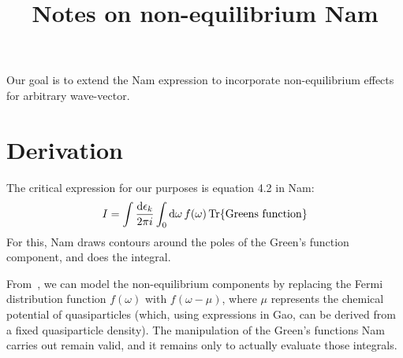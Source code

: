 \documentclass{article}
\title{Notes on non-equilibrium Nam}
\begin{document}
\maketitle

Our goal is to extend the Nam expression to incorporate non-equilibrium effects for arbitrary wave-vector.

\section{Derivation}
The critical expression for our purposes is equation 4.2 in Nam\cite{Nam1967}:
\begin{equation}
	I = \int \frac{\dd{\epsilon_k}}{2 \pi i} \int_0 \dd{\omega} f(\omega) \Tr{\mathrm{Greens\ function}}
\end{equation}
For this, Nam draws contours around the poles of the Green's function component, and does the integral.

From~\cite{Gao2008}, we can model the non-equilibrium components by replacing the Fermi distribution function $f(\omega)$ with $f(\omega - \mu)$, where $\mu$ represents the chemical potential of quasiparticles (which, using expressions in Gao, can be derived from a fixed quasiparticle density).
The manipulation of the Green's functions Nam carries out remain valid, and it remains only to actually evaluate those integrals.

\printbibliography
\end{document}

